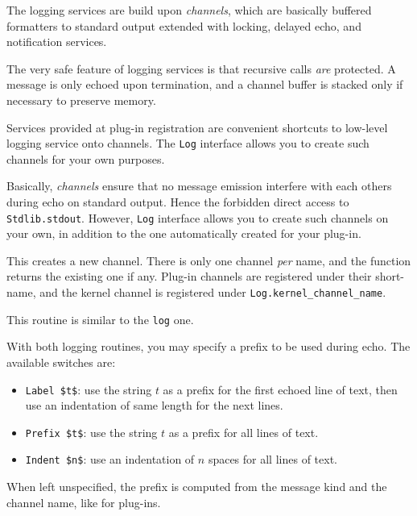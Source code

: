 The logging services are build upon \emph{channels}, which are
basically buffered formatters to standard output extended with
locking, delayed echo, and notification services.

The very safe feature of logging services is that recursive calls
\emph{are} protected. A message is only echoed upon termination,
and a channel buffer is stacked only if necessary to preserve memory.

Services provided at plug-in registration are convenient shortcuts to
low-level logging service onto channels. The \lstinline{Log} interface
allows you to create such channels for your own purposes.

Basically, \emph{channels} ensure that no message emission interfere
with each others during echo on standard output. Hence the forbidden
direct access to \lstinline{Stdlib.stdout}. However,
\lstinline{Log} interface allows you to create such channels on your
own, in addition to the one automatically created for your plug-in.

\begin{description}
  This creates a new channel. There is only one channel \emph{per}
  name, and the function returns the existing one if
  any. Plug-in channels are registered under their short-name, and
  the kernel channel is registered under \lstinline{Log.kernel_channel_name}.

  This routine is similar to the \lstinline{log} one.

\end{description}

With both logging routines, you may specify a prefix to be used during
echo. The available switches are:
\begin{itemize}
\item[] \lstinline|Label $t$|: use the string $t$ as a prefix for the
  first echoed line of text, then use an indentation of same length
  for the next lines.
\item[] \lstinline|Prefix $t$|: use the string $t$ as a prefix for all
  lines of text.
\item[] \lstinline|Indent $n$|: use an indentation of $n$ spaces for
  all lines of text.
\end{itemize}

When left unspecified, the prefix is computed from the message kind
and the channel name, like for plug-ins.

